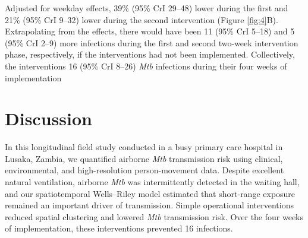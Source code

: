 \documentclass[11pt]{article}
\begin{document}
Adjusted for weekday effects,  39\% (95\% CrI 29--48) lower during the first and 21\% (95\% CrI 9--32) lower during the second intervention (Figure \ref{fig:4}B). Extrapolating from the  effects, there would have been 11 (95\% CrI 5--18) and 5 (95\% CrI 2--9) more infections during the first and second two-week intervention phase, respectively, if the interventions had not been implemented. Collectively, the interventions  16 (95\% CrI 8--26) \emph{Mtb} infections\label{chg:R2.1results} during their four weeks of implementation\label{chg:R2.9rates}

\section{Discussion}\label{discussion}

In this longitudinal field study conducted in a busy primary care hospital in Lusaka, Zambia, we quantified airborne \emph{Mtb} transmission risk using clinical, environmental, and high-resolution person-movement data. Despite excellent natural ventilation, airborne \emph{Mtb} was intermittently detected in the waiting hall, and our spatiotemporal Wells--Riley model estimated that short-range exposure remained an important driver of transmission. Simple operational interventions reduced spatial clustering and lowered  \emph{Mtb} transmission risk. Over the four weeks of implementation, these interventions  prevented  16 infections.\label{chg:R2.1disc1}
\end{document}
